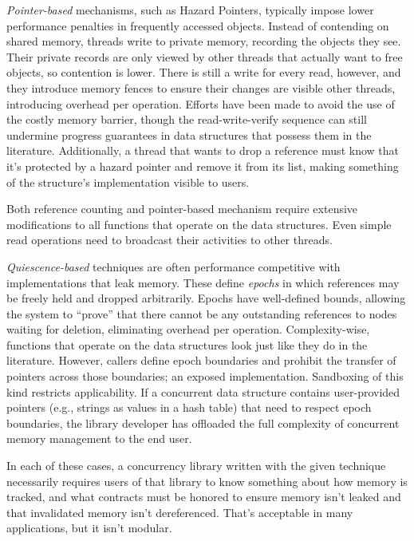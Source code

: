 \textit{Pointer-based} mechanisms, such as Hazard Pointers\cite{HP, DTA, PassTheBuck}, typically impose lower performance penalties in frequently accessed objects.  Instead of contending on shared memory, threads write to private memory, recording the objects they see.  Their private records are only viewed by other threads that actually want to free objects, so contention is lower.  There is still a write for every read, however, and they introduce memory fences to ensure their changes are visible other threads, introducing overhead per operation.  Efforts have been made to avoid the use of the costly memory barrier,\cite{MauriceCadence, HazardEras} though the read-write-verify sequence can still undermine progress guarantees in data structures that possess them in the literature.\cite{Brown15}  Additionally, a thread that wants to drop a reference must know that it's protected by a hazard pointer and remove it from its list, making something of the structure's implementation visible to users.

Both reference counting and pointer-based mechanism require extensive modifications to all functions that operate on the data structures.  Even simple read operations need to broadcast their activities to other threads.

\textit{Quiescence-based} techniques\cite{FraserH07, Harris, Hart} are often performance competitive with implementations that leak memory.  These define \textit{epochs} in which references may be freely held and dropped arbitrarily.  Epochs have well-defined bounds, allowing the system to ``prove'' that there cannot be any outstanding references to nodes waiting for deletion, eliminating overhead per operation.  Complexity-wise, functions that operate on the data structures look just like they do in the literature.  However, callers define epoch boundaries and prohibit the transfer of pointers across those boundaries; an exposed implementation.  Sandboxing of this kind restricts applicability.  If a concurrent data structure contains user-provided pointers (e.g., strings as values in a hash table) that need to respect epoch boundaries, the library developer has offloaded the full complexity of concurrent memory management to the end user.

In each of these cases, a concurrency library written with the given technique necessarily requires users of that library to know something about how memory is tracked, and what contracts must be honored to ensure memory isn't leaked and that invalidated memory isn't dereferenced.  That's acceptable in many applications, but it isn't modular.

